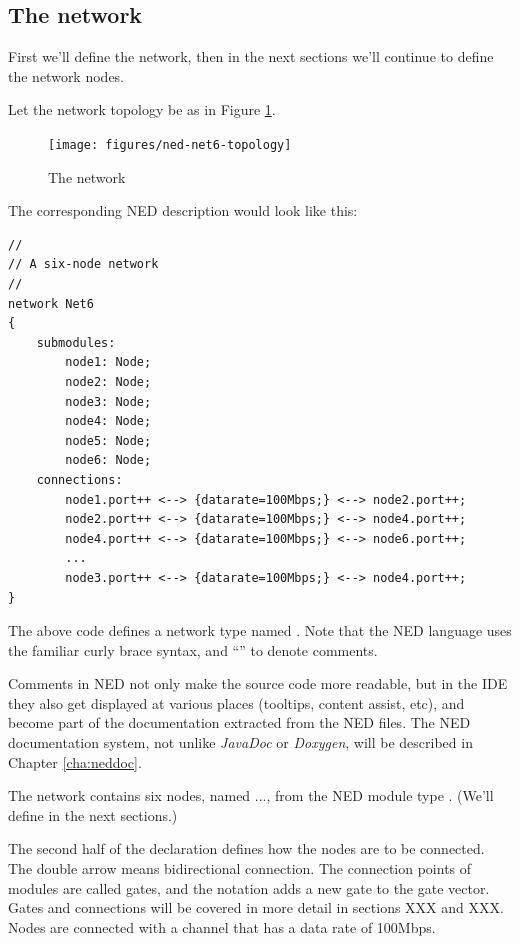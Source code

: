 
\subsection{The network}

First we'll define the network, then in the next sections we'll continue
to define the network nodes.

Let the network topology be as in Figure \ref{fig:ned-net6-topology}.

\begin{figure}[htbp]
  \begin{center}
    \texttt{[image: figures/ned-net6-topology]}
    \caption{The network}
    \label{fig:ned-net6-topology}
  \end{center}
\end{figure}

The corresponding NED description would look like this:

\begin{Verbatim}
//
// A six-node network
//
network Net6
{
    submodules:
        node1: Node;
        node2: Node;
        node3: Node;
        node4: Node;
        node5: Node;
        node6: Node;
    connections:
        node1.port++ <--> {datarate=100Mbps;} <--> node2.port++;
        node2.port++ <--> {datarate=100Mbps;} <--> node4.port++;
        node4.port++ <--> {datarate=100Mbps;} <--> node6.port++;
        ...
        node3.port++ <--> {datarate=100Mbps;} <--> node4.port++;
}
\end{Verbatim}

The above code defines a network type named . Note that the NED
language uses the familiar curly brace syntax, and ``\ttt{//}'' to denote
comments.

\begin{note}
    Comments in NED not only make the source code more readable, but in the
    {\opp} IDE they also get displayed at various places (tooltips, content
    assist, etc), and become part of the documentation extracted from the NED
    files. The NED documentation system, not unlike \textit{JavaDoc} or
    \textit{Doxygen}, will be described in Chapter \ref{cha:neddoc}.
\end{note}

The network contains six nodes, named ...,
from the NED module type . (We'll define  in the next
sections.)

The second half of the declaration defines how the nodes are to be
connected. The double arrow means bidirectional connection. The connection
points of modules are called gates, and the  notation adds a
new gate to the  gate vector. Gates and connections will be
covered in more detail in sections XXX and XXX. Nodes are connected
with a channel that has a data rate of 100Mbps.

